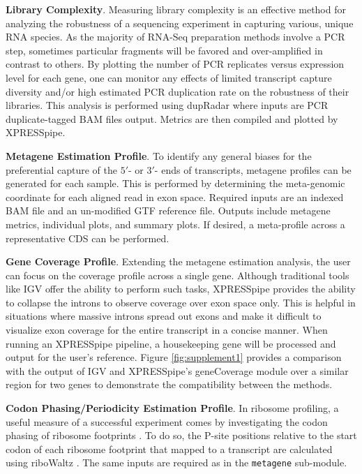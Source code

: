\documentclass[10pt, oneside]{article}
\begin{document}
\begin{multicols}{2}
\noindent\textbf{Library Complexity}. Measuring library complexity is an effective method for analyzing the robustness of a sequencing experiment in capturing various, unique RNA species. As the majority of RNA-Seq preparation methods involve a PCR step, sometimes particular fragments will be favored and over-amplified in contrast to others. By plotting the number of PCR replicates versus expression level for each gene, one can monitor any effects of limited transcript capture diversity and/or high estimated PCR duplication rate on the robustness of their libraries. This analysis is performed using dupRadar \cite{dupradar} where inputs are PCR duplicate-tagged BAM files output. Metrics are then compiled and plotted by XPRESSpipe. \par

\noindent\textbf{Metagene Estimation Profile}. To identify any general biases for the preferential capture of the $5'$- or $3'$- ends of transcripts, metagene profiles can be generated for each sample. This is performed by determining the meta-genomic coordinate for each aligned read in exon space. Required inputs are an indexed BAM file and an un-modified GTF reference file. Outputs include metagene metrics, individual plots, and summary plots. If desired, a meta-profile across a representative CDS can be performed. \par

\noindent\textbf{Gene Coverage Profile}. Extending the metagene estimation analysis, the user can focus on the coverage profile across a single gene. Although traditional tools like IGV \cite{igv} offer the ability to perform such tasks, XPRESSpipe provides the ability to collapse the introns to observe coverage over exon space only. This is helpful in situations where massive introns spread out exons and make it difficult to visualize exon coverage for the entire transcript in a concise manner. When running an XPRESSpipe pipeline, a housekeeping gene will be processed and output for the user's reference. Figure \ref{fig:supplement1} provides a comparison with the output of IGV \cite{igv} and XPRESSpipe's geneCoverage module over a similar region for two genes to demonstrate the compatibility between the methods. \par

\noindent\textbf{Codon Phasing/Periodicity Estimation Profile}. In ribosome profiling, a useful measure of a successful experiment comes by investigating the codon phasing of ribosome footprints \cite{ingolia_meth}. To do so, the P-site positions relative to the start codon of each ribosome footprint that mapped to a transcript are calculated using riboWaltz \cite{ribowaltz}. The same inputs are required as in the \texttt{metagene} sub-module. \par


\end{multicols}
\end{document}
